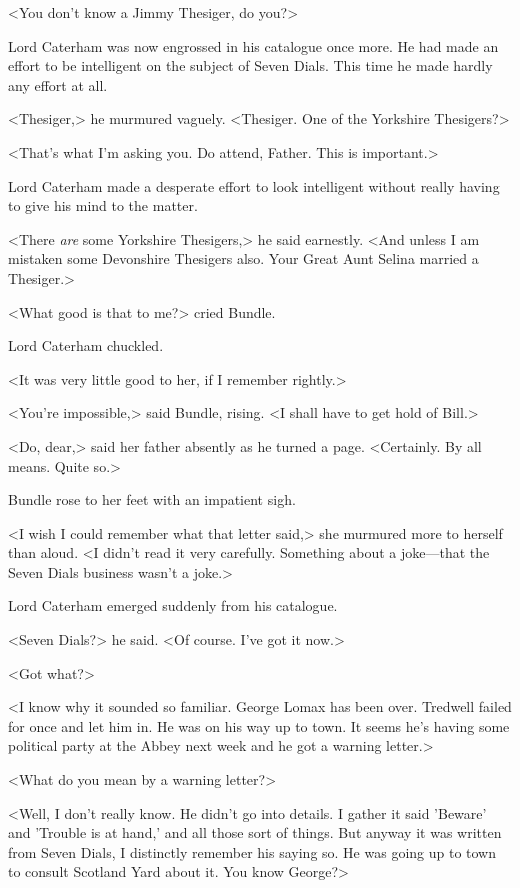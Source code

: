 <You don't know a Jimmy Thesiger, do you?>

Lord Caterham was now engrossed in his catalogue once more. He had made an effort to be intelligent on the subject of Seven Dials. This time he made hardly any effort at all.

<Thesiger,> he murmured vaguely. <Thesiger. One of the Yorkshire Thesigers?>

<That's what I'm asking you. Do attend, Father. This is important.>

Lord Caterham made a desperate effort to look intelligent without really having to give his mind to the matter.

<There \emph{are} some Yorkshire Thesigers,> he said earnestly. <And unless I am mistaken some Devonshire Thesigers also. Your Great Aunt Selina married a Thesiger.>

<What good is that to me?> cried Bundle.

Lord Caterham chuckled.

<It was very little good to her, if I remember rightly.>

<You're impossible,> said Bundle, rising. <I shall have to get hold of Bill.>

<Do, dear,> said her father absently as he turned a page. <Certainly. By all means. Quite so.>

Bundle rose to her feet with an impatient sigh.

<I wish I could remember what that letter said,> she murmured more to herself than aloud. <I didn't read it very carefully. Something about a joke—that the Seven Dials business wasn't a joke.>

Lord Caterham emerged suddenly from his catalogue.

<Seven Dials?> he said. <Of course. I've got it now.>

<Got what?>

<I know why it sounded so familiar. George Lomax has been over. Tredwell failed for once and let him in. He was on his way up to town. It seems he's having some political party at the Abbey next week and he got a warning letter.>

<What do you mean by a warning letter?>

<Well, I don't really know. He didn't go into details. I gather it said 'Beware' and 'Trouble is at hand,' and all those sort of things. But anyway it was written from Seven Dials, I distinctly remember his saying so. He was going up to town to consult Scotland Yard about it. You know George?>

